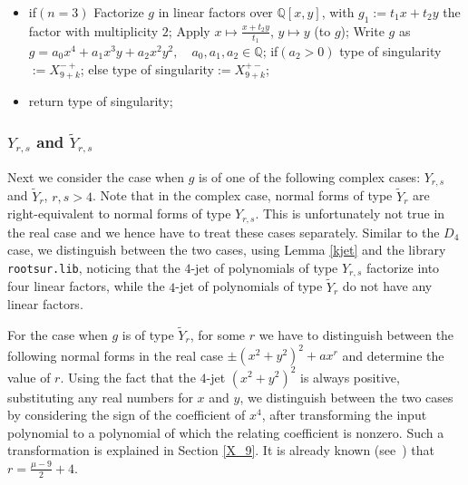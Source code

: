 \documentclass[noend]{amsproc}
\begin{document}
\begin{itemize}
\item if$(n=3)$\newline
\phantom{}\quad Factorize $g$ in linear factors over $\mathbb Q[x,y]$,
with $g_1:=t_1x+t_2y$ the factor\newline
\phantom{}\quad with multiplicity $2$;\newline
\phantom{}\quad Apply $x\mapsto\frac{x+t_2y}{t_1}$, $y\mapsto y$ (to $g$);
\newline
\phantom{}\quad Write $g$ as $g=a_0x^4+a_1x^3y+a_2x^2y^2,\quad
a_0,a_1,a_2\in\mathbb Q$;\newline
\phantom{}\quad if$(a_2>0)$\newline
\phantom{}\quad\quad type of singularity$ := X_{9+k}^{-+}$;\newline
\phantom{}\quad else\newline
\phantom{}\quad\quad type of singularity$ := X_{9+k}^{+-}$;
\item return type of singularity;
\end{itemize}

\subsubsection{$Y_{r,s}$ and $\widetilde Y_{r,s}$} Next we consider the case when $g$ is of one of the following complex cases:
$Y_{r,s}$ and $\widetilde Y_r$, $r,s>4$. Note that in the complex case, normal
forms of type $\widetilde Y_r$ are right-equivalent to normal forms of type
$Y_{r,s}$. This is unfortunately not true in the real case and we hence have to
treat these cases separately.  Similar to the $D_4$ case, we distinguish
between the two cases, using Lemma \ref{kjet} and the library {\tt rootsur.lib},
noticing that the $4$-jet of polynomials of type $Y_{r,s}$ factorize into four
linear factors, while the $4$-jet of polynomials of type $\widetilde Y_r$ do
not have any linear factors.

For the case when $g$ is of type $\widetilde Y_r$, for some $r$ we have to
distinguish between the following normal forms in the real case
$\pm(x^2+y^2)^2+ax^r$ and determine the value of $r$. Using the fact that the
$4$-jet $(x^2+y^2)^2$ is always positive, substituting any real numbers for $x$
and $y$,  we distinguish between the two cases by considering the sign of the coefficient of $x^4$, after transforming the input polynomial to a polynomial of which the relating coefficient is nonzero. Such a transformation is explained in Section \ref{X_9}. It is
already known (see~\cite{AVG1985}) that $r=\frac{\mu-9}{2}+4$.
\end{document}
